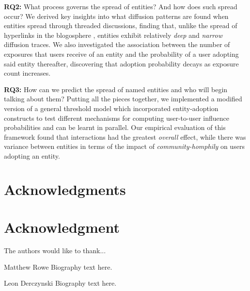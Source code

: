 \documentclass[10pt,journal,compsoc]{IEEEtran}
\begin{document}
 \textbf{RQ2:} What process governs the spread of entities? And how does such spread occur?
We derived key insights into what diffusion patterns are found when entities spread through threaded discussions,  finding that, unlike the spread of hyperlinks in the blogosphere \cite{leskovec2007patterns}, entities exhibit relatively \emph{deep} and \emph{narrow} diffusion traces.
We also investigated the association between the number of exposures that users receive of an entity and the probability of a user adopting said entity thereafter, discovering that adoption probability decays as exposure count increases.

 \textbf{RQ3:} How can we predict the spread of named entities and who will begin talking about them?	
Putting all the pieces together, we implemented a modified version of a general threshold model which incorporated entity-adoption constructs to test different mechanisms for computing user-to-user influence probabilities and can be learnt in parallel.
Our empirical evaluation of this framework found that interactions had the greatest \emph{overall} effect, while there was variance between entities in terms of the impact of \emph{community-homphily} on users adopting an entity.

\ifCLASSOPTIONcompsoc
  \section*{Acknowledgments}
\else
  \section*{Acknowledgment}
\fi
The authors would like to thank...






\begin{IEEEbiography}{Matthew Rowe}
Biography text here.
\end{IEEEbiography}

\begin{IEEEbiography}{Leon Derczynski}
Biography text here.
\end{IEEEbiography}
\end{document}
